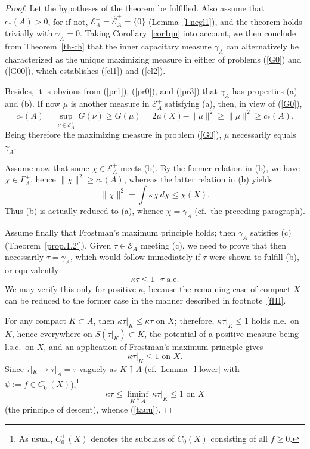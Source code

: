 \documentclass[12pt,a4paper,reqno]{amsart} %
\theoremstyle{lause}
\theoremstyle{maaritelma}
\theoremstyle{lause}
\theoremstyle{maaritelma}
\numberwithin{equation}{section}
\begin{document}
\begin{proof}Let the hypotheses of the theorem be fulfilled. Also assume that $c_*(A)>0$, for if not, $\mathcal E^+_A=\widehat{\mathcal E}^+_A=\{0\}$  (Lemma~\ref{l-negl1}), and the theorem holds trivially with $\gamma_A=0$.
Taking Corollary~\ref{cor1qu} into account, we then conclude from Theorem~\ref{th-ch} that the inner capacitary measure $\gamma_A$ can alternatively be characterized as the unique maximizing measure in either of problems (\ref{G0}) and (\ref{G00}), which establishes (\ref{cl1}) and (\ref{cl2}).

Besides, it is obvious from (\ref{pr1}), (\ref{pr0}), and (\ref{pr3}) that $\gamma_A$ has properties (a) and (b). If now $\mu$ is another measure in $\mathcal E^+_A$ satisfying (a), then, in view of (\ref{G0}),
\[c_*(A)=\sup_{\nu\in\mathcal E^+_A}\,G(\nu)\geqslant G(\mu)=2\mu(X)-\|\mu\|^2\geqslant\|\mu\|^2\geqslant c_*(A).\]
Being therefore the maximizing measure in problem (\ref{G0}), $\mu$ necessarily equals $\gamma_A$.

Assume now that some $\chi\in\mathcal E^+_A$ meets (b). By the former relation in (b), we have $\chi\in\Gamma^+_A$, hence $\|\chi\|^2\geqslant c_*(A)$, whereas the latter relation in (b) yields
\[\|\chi\|^2=\int\kappa\chi\,d\chi\leqslant\chi(X).\] Thus (b) is actually reduced to (a), whence  $\chi=\gamma_A$ (cf.\ the preceding paragraph).

Assume finally that Frostman's maximum principle holds; then $\gamma_A$ satisfies (c) (Theorem~\ref{prop.1.2'}).
Given $\tau\in\mathcal E^+_A$ meeting (c), we need to prove that then necessarily $\tau=\gamma_A$, which would follow immediately if $\tau$ were shown to fulfill (b), or equivalently
\begin{equation}\label{tauu}\kappa\tau\leqslant1\text{ \ $\tau$-a.e.}\end{equation}
We may verify this only for positive $\kappa$, because the remaining case of compact $X$ can be reduced to the former case in the manner described in footnote~\ref{fIII}.

For any compact $K\subset A$, then $\kappa\tau|_K\leqslant\kappa\tau$ on $X$; therefore, $\kappa\tau|_K\leqslant1$ holds n.e.\ on $K$, hence everywhere on $S(\tau|_K)\subset K$, the potential of a positive measure being l.s.c.\ on $X$, and an application of Frostman's maximum principle gives
\[\kappa\tau|_K\leqslant1\text{ \ on $X$}.\]
Since $\tau|_K\to\tau|_A=\tau$ vaguely as $K\uparrow A$ (cf.\ Lemma~\ref{l-lower} with $\psi:=f\in C^+_0(X)$),\footnote{As usual, $C_0^+(X)$ denotes the subclass of $C_0(X)$ consisting of all $f\geqslant0$.}
\[\kappa\tau\leqslant\liminf_{K\uparrow A}\,\kappa\tau|_K\leqslant1\text{ \ on $X$}\]
(the principle of descent), whence (\ref{tauu}).\end{proof}
\end{document}
